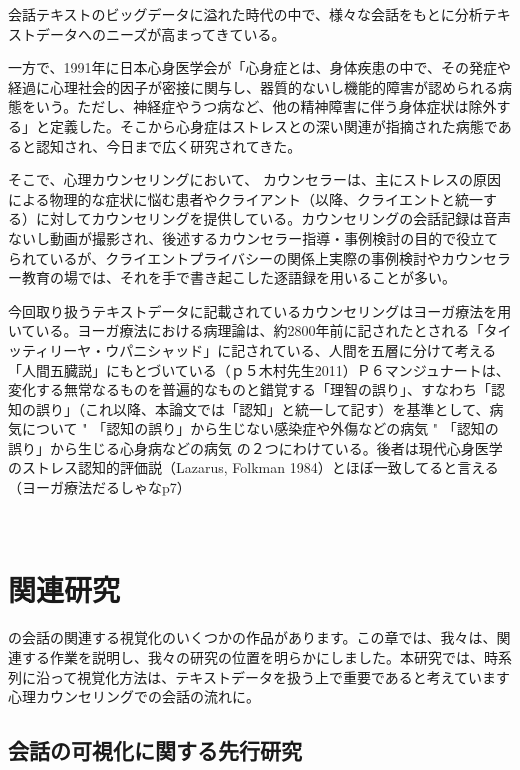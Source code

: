 \documentclass[shuuron]{kuee}
\begin{document}

会話テキストのビッグデータに溢れた時代の中で、様々な会話をもとに分析テキストデータへのニーズが高まってきている。

一方で、1991年に日本心身医学会が「心身症とは、身体疾患の中で、その発症や経過に心理社会的因子が密接に関与し、器質的ないし機能的障害が認められる病態をいう。ただし、神経症やうつ病など、他の精神障害に伴う身体症状は除外する」と定義した。そこから心身症はストレスとの深い関連が指摘された病態であると認知され、今日まで広く研究されてきた。

  そこで、心理カウンセリングにおいて、 カウンセラーは、主にストレスの原因による物理的な症状に悩む患者やクライアント（以降、クライエントと統一する）に対してカウンセリングを提供している。カウンセリングの会話記録は音声ないし動画が撮影され、後述するカウンセラー指導・事例検討の目的で役立てられているが、クライエントプライバシーの関係上実際の事例検討やカウンセラー教育の場では、それを手で書き起こした逐語録を用いることが多い。


今回取り扱うテキストデータに記載されているカウンセリングはヨーガ療法を用いている。ヨーガ療法における病理論は、約2800年前に記されたとされる「タイッティリーヤ・ウパニシャッド」に記されている、人間を五層に分けて考える「人間五臓説」にもとづいている（ｐ５木村先生2011）Ｐ６マンジュナートは、変化する無常なるものを普遍的なものと錯覚する「理智の誤り」、すなわち「認知の誤り」（これ以降、本論文では「認知」と統一して記す）を基準として、病気について
"	「認知の誤り」から生じない感染症や外傷などの病気
"	「認知の誤り」から生じる心身病などの病気
の２つにわけている。後者は現代心身医学のストレス認知的評価説（Lazarus, Folkman 1984）とほぼ一致してると言える（ヨーガ療法だるしゃなp7）


　

\chapter{関連研究}






  の会話の関連する視覚化のいくつかの作品があります。この章では、我々は、関連する作業を説明し、我々の研究の位置を明らかにしました。本研究では、時系列に沿って視覚化方法は、テキストデータを扱う上で重要であると考えています 心理カウンセリングでの会話の流れに。


\section{会話の可視化に関する先行研究}
\end{document}
